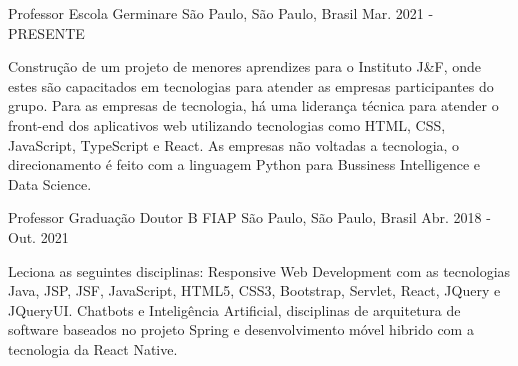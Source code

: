 

\begin{cventries}

  \cventry
    {Professor} %
    {Escola Germinare} %
    {São Paulo, São Paulo, Brasil} %
    {Mar. 2021 - PRESENTE} %
    {
      \begin{cvitems} %
        \item {Construção de um projeto de menores aprendizes para o Instituto J&F, onde estes são capacitados em tecnologias para atender as empresas participantes do grupo. Para as empresas de tecnologia, há uma liderança técnica para atender o front-end dos aplicativos web utilizando tecnologias como HTML, CSS, JavaScript, TypeScript e React. As empresas não voltadas a tecnologia, o direcionamento é feito com a linguagem Python para Bussiness Intelligence e Data Science.}
      \end{cvitems}
    }

  \cventry
    {Professor Graduação Doutor B} %
    {FIAP} %
    {São Paulo, São Paulo, Brasil} %
    {Abr. 2018 - Out. 2021} %
    {
      \begin{cvitems} %
        \item {Leciona as seguintes disciplinas: Responsive Web Development com as tecnologias Java, JSP, JSF, JavaScript, HTML5, CSS3, Bootstrap, Servlet, React, JQuery e JQueryUI. Chatbots e Inteligência Artificial, disciplinas de arquitetura de software baseados no projeto Spring e desenvolvimento móvel hibrido com a tecnologia da React Native.}
      \end{cvitems}
    }


\end{cventries}

